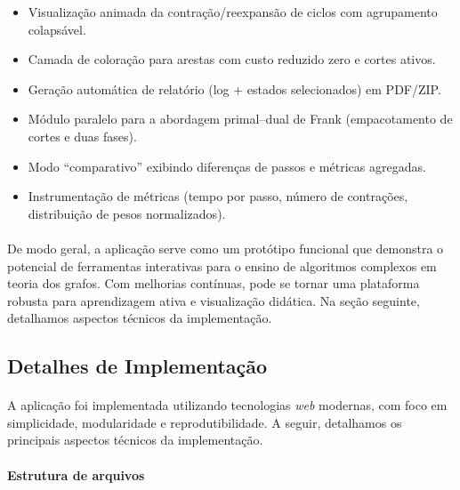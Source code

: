 \documentclass[12pt,a4paper]{article}
\begin{document}
\begin{itemize}\setlength{\itemsep}{2pt}
    \item Visualização animada da contração/reexpansão de ciclos com agrupamento colapsável.
    \item Camada de coloração para arestas com custo reduzido zero e cortes ativos.
    \item Geração automática de relatório (log + estados selecionados) em PDF/ZIP.
    \item Módulo paralelo para a abordagem primal--dual de Frank (empacotamento de cortes e duas fases).
    \item Modo “comparativo” exibindo diferenças de passos e métricas agregadas.
    \item Instrumentação de métricas (tempo por passo, número de contrações, distribuição de pesos normalizados).
\end{itemize}

\paragraph{}
De modo geral, a aplicação serve como um protótipo funcional que demonstra o potencial de ferramentas interativas para o ensino de algoritmos complexos em teoria dos grafos. Com melhorias contínuas, pode se tornar uma plataforma robusta para aprendizagem ativa e visualização didática. Na seção seguinte, detalhamos aspectos técnicos da implementação.

\subsection{Detalhes de Implementação}
\paragraph{}
A aplicação foi implementada utilizando tecnologias \textit{web} modernas, com foco em simplicidade, modularidade e reprodutibilidade. A seguir, detalhamos os principais aspectos técnicos da implementação.

\paragraph{Estrutura de arquivos}
\end{document}
